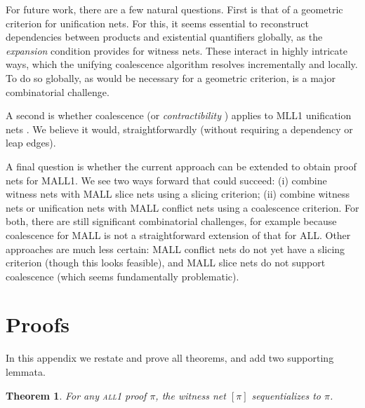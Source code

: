 \documentclass[a4paper,UKenglish]{lipics-v2019}
\newcommand\all{\textsc{all}}
\newcommand\+{+}
\renewcommand\*{\times}
\begin{document}
For future work, there are a few natural questions. First is that of a geometric criterion for unification nets. For this, it seems essential to reconstruct dependencies between products and existential quantifiers globally, as the \emph{expansion} condition provides for witness nets. These interact in highly intricate ways, which the unifying coalescence algorithm resolves incrementally and locally. To do so globally, as would be necessary for a geometric criterion, is a major combinatorial challenge.

A second is whether coalescence (or \emph{contractibility} \cite{Danos-1990}) applies to MLL1 unification nets \cite{Hughes-2018}. We believe it would, straightforwardly (without requiring a dependency or leap edges).

A final question is whether the current approach can be extended to obtain proof nets for MALL1. We see two ways forward that could succeed: (i) combine witness nets with MALL slice nets \cite{Hughes-vanGlabbeek-2005} using a slicing criterion; (ii) combine witness nets or unification nets with MALL conflict nets \cite{Hughes-Heijltjes-2016} using a coalescence criterion. For both, there are still significant combinatorial challenges, for example because coalescence for MALL is not a straightforward extension of that for ALL. Other approaches are much less certain: MALL conflict nets do not yet have a slicing criterion (though this looks feasible), and MALL slice nets do not support coalescence (which seems fundamentally problematic).





\newpage
\appendix

\theoremstyle{plain}
\newtheorem{retheorem}{Theorem}
\newtheorem{relemma}[retheorem]{Lemma}

\section{Proofs}

In this appendix we restate and prove all theorems, and add two supporting lemmata.

\addtocounter{retheorem}{-1}
\begin{retheorem}
For any \all{\textnormal 1} proof $\pi$, the witness net $[\pi]$ sequentializes to $\pi$. 
\end{retheorem}
\end{document}
